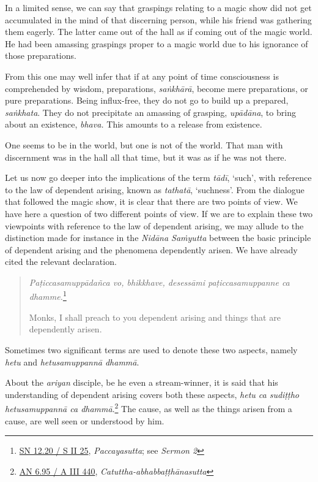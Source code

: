 In a limited sense, we can say that graspings relating to a magic show did not get accumulated in the mind of that discerning person, while his friend was gathering them eagerly. The latter came out of the hall as if coming out of the magic world. He had been amassing graspings proper to a magic world due to his ignorance of those preparations.

From this one may well infer that if at any point of time consciousness is comprehended by wisdom, preparations, \emph{saṅkhārā}, become mere preparations, or pure preparations. Being influx-free, they do not go to build up a prepared, \emph{saṅkhata}. They do not precipitate an amassing of grasping, \emph{upādāna}, to bring about an existence, \emph{bhava.} This amounts to a release from existence.

One seems to be in the world, but one is not of the world. That man with discernment was in the hall all that time, but it was as if he was not there.

Let us now go deeper into the implications of the term \emph{tādī}, `such', with reference to the law of dependent arising, known as \emph{tathatā}, `suchness'. From the dialogue that followed the magic show, it is clear that there are two points of view. We have here a question of two different points of view. If we are to explain these two viewpoints with reference to the law of dependent arising, we may allude to the distinction made for instance in the \emph{Nidāna Saṁyutta} between the basic principle of dependent arising and the phenomena dependently arisen. We have already cited the relevant declaration.

\begin{quote}
\emph{Paṭiccasamuppādañca vo, bhikkhave, desessāmi paṭiccasamuppanne ca dhamme.}\footnote{\href{https://suttacentral.net/sn12.20/pli/ms}{SN 12.20 / S II 25}, \emph{Paccayasutta}; see \emph{Sermon 2}}

Monks, I shall preach to you dependent arising and things that are dependently arisen.
\end{quote}

Sometimes two significant terms are used to denote these two aspects, namely \emph{hetu} and \emph{hetusamuppannā dhammā}.

About the \emph{ariyan} disciple, be he even a stream-winner, it is said that his understanding of dependent arising covers both these aspects, \emph{hetu ca sudiṭṭho hetusamuppannā ca dhammā}.\footnote{\href{https://suttacentral.net/an6.95/pli/ms}{AN 6.95 / A III 440}, \emph{Catuttha-abhabbaṭṭhānasutta}} The cause, as well as the things arisen from a cause, are well seen or understood by him.

